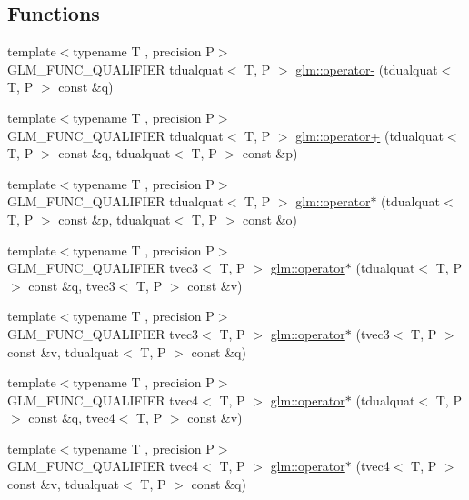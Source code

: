 \subsection*{Functions}
\begin{DoxyCompactItemize}
\item 
{\footnotesize template$<$typename T , precision P$>$ }\\G\+L\+M\+\_\+\+F\+U\+N\+C\+\_\+\+Q\+U\+A\+L\+I\+F\+I\+E\+R tdualquat$<$ T, P $>$ \hyperlink{namespaceglm_a6502f16b761d62c1a4d9558c8403c509}{glm\+::operator-\/} (tdualquat$<$ T, P $>$ const \&q)
\item 
{\footnotesize template$<$typename T , precision P$>$ }\\G\+L\+M\+\_\+\+F\+U\+N\+C\+\_\+\+Q\+U\+A\+L\+I\+F\+I\+E\+R tdualquat$<$ T, P $>$ \hyperlink{group__gtx__dual__quaternion_ga9d7cfca38c6ff90757705600da3c7972}{glm\+::operator+} (tdualquat$<$ T, P $>$ const \&q, tdualquat$<$ T, P $>$ const \&p)
\item 
{\footnotesize template$<$typename T , precision P$>$ }\\G\+L\+M\+\_\+\+F\+U\+N\+C\+\_\+\+Q\+U\+A\+L\+I\+F\+I\+E\+R tdualquat$<$ T, P $>$ \hyperlink{group__gtx__dual__quaternion_ga2c224f87242fe82e8ebc17f01aa51126}{glm\+::operator$\ast$} (tdualquat$<$ T, P $>$ const \&p, tdualquat$<$ T, P $>$ const \&o)
\item 
{\footnotesize template$<$typename T , precision P$>$ }\\G\+L\+M\+\_\+\+F\+U\+N\+C\+\_\+\+Q\+U\+A\+L\+I\+F\+I\+E\+R tvec3$<$ T, P $>$ \hyperlink{namespaceglm_af87c18c3c73e45b62f6d895c323f4a5f}{glm\+::operator$\ast$} (tdualquat$<$ T, P $>$ const \&q, tvec3$<$ T, P $>$ const \&v)
\item 
{\footnotesize template$<$typename T , precision P$>$ }\\G\+L\+M\+\_\+\+F\+U\+N\+C\+\_\+\+Q\+U\+A\+L\+I\+F\+I\+E\+R tvec3$<$ T, P $>$ \hyperlink{namespaceglm_ad837ea15bead96f4ecb1335c61c05697}{glm\+::operator$\ast$} (tvec3$<$ T, P $>$ const \&v, tdualquat$<$ T, P $>$ const \&q)
\item 
{\footnotesize template$<$typename T , precision P$>$ }\\G\+L\+M\+\_\+\+F\+U\+N\+C\+\_\+\+Q\+U\+A\+L\+I\+F\+I\+E\+R tvec4$<$ T, P $>$ \hyperlink{namespaceglm_af7e4c7f9357bbbd507b6c3e21c615155}{glm\+::operator$\ast$} (tdualquat$<$ T, P $>$ const \&q, tvec4$<$ T, P $>$ const \&v)
\item 
{\footnotesize template$<$typename T , precision P$>$ }\\G\+L\+M\+\_\+\+F\+U\+N\+C\+\_\+\+Q\+U\+A\+L\+I\+F\+I\+E\+R tvec4$<$ T, P $>$ \hyperlink{namespaceglm_a7b2a46a8862527e45c3d7bd3fdfcfa10}{glm\+::operator$\ast$} (tvec4$<$ T, P $>$ const \&v, tdualquat$<$ T, P $>$ const \&q)

\end{DoxyCompactItemize}
